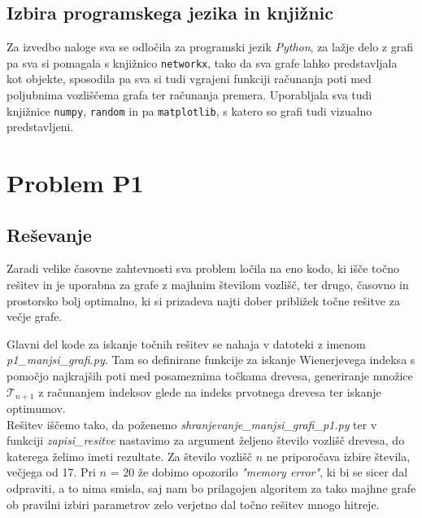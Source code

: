 \documentclass[a4paper, 12 pt]{article}
\begin{document}
\subsection{Izbira programskega jezika in knjižnic}

Za izvedbo naloge sva se odločila za programski jezik \textit{Python}, za lažje delo z grafi pa sva si pomagala s knjižnico \texttt{networkx}, tako da sva grafe lahko predstavljala kot objekte, sposodila pa sva si tudi vgrajeni funkciji računanja poti med poljubnima vozliščema grafa ter računanja premera. Uporabljala sva tudi knjižnice \texttt{numpy}, \texttt{random} in pa \texttt{matplotlib}, s katero so grafi tudi vizualno predstavljeni.



\pagebreak

\section{Problem P1}

\subsection{Reševanje}

Zaradi velike časovne zahtevnosti sva problem ločila na eno kodo, ki išče točno rešitev in je uporabna za grafe z majhnim številom vozlišč, ter drugo, časovno in prostorsko bolj optimalno, ki si prizadeva najti dober približek točne rešitve za večje grafe.
\vspace{0.5cm}

Glavni del kode za iskanje točnih rešitev se nahaja v datoteki z imenom \textit{p1\_manjsi\_grafi.py}. Tam so definirane funkcije za iskanje Wienerjevega indeksa s pomočjo najkrajših poti med posameznima točkama drevesa, generiranje množice $\mathscr{T}_{n+1}$  z računanjem indeksov glede na indeks prvotnega drevesa ter iskanje optimumov. \\

Rešitev iščemo tako, da poženemo \textit{shranjevanje\_manjsi\_grafi\_p1.py} ter v funkciji \textit{zapisi\_resitve} nastavimo za argument željeno število vozlišč drevesa, do katerega želimo imeti rezultate. Za število vozlišč $n$ ne priporočava izbire števila, večjega od 17. Pri $n$ = 20 že dobimo opozorilo \textit{"memory error"}, ki bi se sicer dal odpraviti, a to nima smisla, saj nam bo prilagojen algoritem za tako majhne grafe ob pravilni izbiri parametrov zelo verjetno dal točno rešitev mnogo hitreje.
\vspace{0.5cm}
\end{document}
